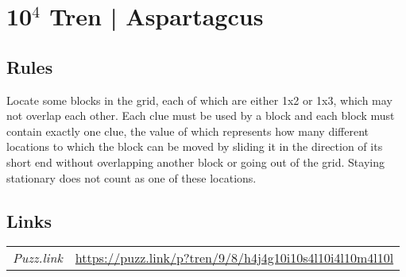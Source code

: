 \section[10$^4$ Tren | Aspartagcus {[\emph{Tren}]}]{10$^4$ Tren | {\normalfont Aspartagcus}}
\label{sec:55-104-tren-aspartagcus}

\subsection*{Rules}
\begin{markdown}
Locate some blocks in the grid, each of which are either 1x2 or 1x3, which may not overlap each other. Each clue must be used by a block and each block must contain exactly one clue, the value of which represents how many different locations to which the block can be moved by sliding it in the direction of its short end without overlapping another block or going out of the grid. Staying stationary does not count as one of these locations.
\end{markdown}
\subsection*{Links}
\begin{tabularx}{\textwidth}{l X}
\emph{Puzz.link} & \url{https://puzz.link/p?tren/9/8/h4j4g10i10s4l10i4l10m4l10l} \\
\end{tabularx}
\pagebreak
